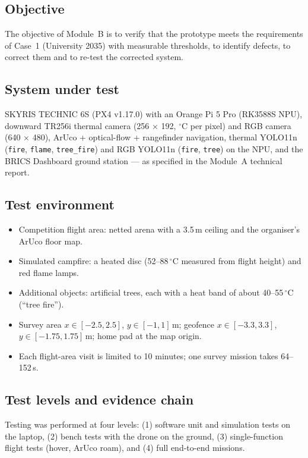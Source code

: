 \documentclass[10pt,a4paper]{article}
\begin{document}
\subsection{Objective}
The objective of Module~B is to verify that the prototype meets the requirements of Case~1 (University 2035) with
measurable thresholds, to identify defects, to correct them and to re-test the corrected system.

\subsection{System under test}
SKYRIS TECHNIC 6S (PX4 v1.17.0) with an Orange Pi 5 Pro (RK3588S NPU), downward TR256i thermal camera (256 $\times$ 192,
$^\circ$C per pixel) and RGB camera (640 $\times$ 480), ArUco + optical-flow + rangefinder navigation, thermal YOLO11n
(\texttt{fire}, \texttt{flame}, \texttt{tree\_fire}) and RGB YOLO11n (\texttt{fire}, \texttt{tree}) on the NPU, and the BRICS
Dashboard ground station --- as specified in the Module~A technical report.

\subsection{Test environment}
\begin{itemize}
  \item Competition flight area: netted arena with a 3.5\,m ceiling and the organiser's ArUco floor map.
  \item Simulated campfire: a heated disc (52--88\,$^\circ$C measured from flight height) and red flame lamps.
  \item Additional objects: artificial trees, each with a heat band of about 40--55\,$^\circ$C (``tree fire'').
  \item Survey area $x \in [-2.5, 2.5]$, $y \in [-1, 1]$\,m; geofence $x \in [-3.3, 3.3]$, $y \in [-1.75, 1.75]$\,m;
        home pad at the map origin.
  \item Each flight-area visit is limited to 10 minutes; one survey mission takes 64--152\,s.
\end{itemize}

\subsection{Test levels and evidence chain}
Testing was performed at four levels: (1) software unit and simulation tests on the laptop, (2) bench tests
with the drone on the ground, (3) single-function flight tests (hover, ArUco roam), and (4) full end-to-end missions.
\end{document}
